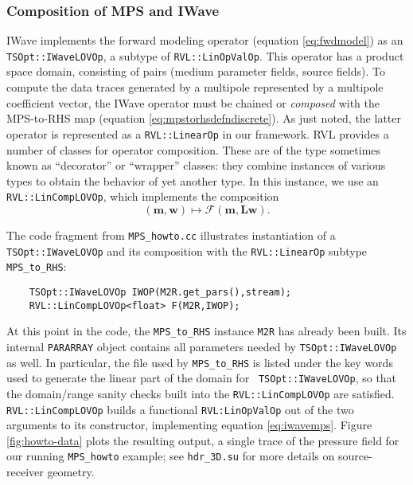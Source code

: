 \subsubsection{Composition of MPS and IWave}


IWave implements the forward modeling operator (equation \ref{eq:fwdmodel}) as an {\tt TSOpt::IWaveLOVOp}, a subtype of {\tt RVL::LinOpValOp}. 
This operator has a product space domain, consisting of pairs (medium parameter fields, source fields). 
To compute the data traces generated by a multipole represented by a multipole coefficient vector, the IWave operator must be chained or {\em composed} with the MPS-to-RHS map (equation \ref{eq:mpstorhsdefndiscrete}). 
As just noted, the latter operator is represented as a {\tt RVL::LinearOp} in our framework.
RVL provides a number of classes for  operator composition. 
These are of the type sometimes known as ``decorator'' or ``wrapper'' classes: they combine instances of various types to obtain the behavior of yet another type. 
In this instance, we use an {\tt RVL::LinCompLOVOp}, which implements the composition
\begin{equation}
\label{eq:iwavemps}
	(\mathbf m,\mathbf w) \mapsto \mathcal F(\mathbf m,\mathbf L \mathbf w).
\end{equation}

The code fragment from {\tt MPS\_howto.cc} illustrates instantiation of a {\tt TSOpt::IWaveLOVOp} and its composition with the {\tt RVL::LinearOp} subtype {\tt MPS\_to\_RHS}:
{\small
\begin{verbatim}
    TSOpt::IWaveLOVOp IWOP(M2R.get_pars(),stream);
    RVL::LinCompLOVOp<float> F(M2R,IWOP);
\end{verbatim}
}
At this point in the code, the {\tt MPS\_to\_RHS} instance {\tt M2R}
has already been built. Its internal {\tt PARARRAY} object contains
all parameters needed by {\tt TSOpt::IWaveLOVOp} as well. In
particular, the file used by {\tt MPS\_to\_RHS} is listed under the
key words used to generate the linear part of the domain for {\tt
  TSOpt::IWaveLOVOp}, so that the domain/range sanity checks built
into the {\tt RVL::LinCompLOVOp} are satisfied.  {\tt RVL::LinCompLOVOp} 
builds a functional {\tt RVL:LinOpValOp} out of
the two arguments to its constructor, implementing equation
\ref{eq:iwavemps}.
Figure \ref{fig:howto-data} plots the resulting output, a single trace of the pressure field for our running {\tt MPS\_howto} example; see {\tt hdr\_3D.su} for more details on source-receiver geometry.

